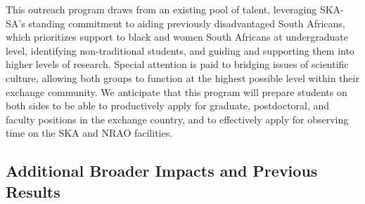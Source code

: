 \documentclass[preprint]{aastex}
\newcommand{\compress}{\vspace{-0.25in}}
\begin{document}
This outreach program draws from an existing pool of talent, 
leveraging SKA-SA's standing commitment to aiding previously disadvantaged South Africans,
which prioritizes support to black and women South Africans at undergraduate level,
identifying non-traditional students, and guiding and supporting them into
higher levels of research.  
Special attention is paid to bridging issues of
scientific culture, allowing both groups to function at the highest possible
level within their exchange community.  We anticipate that this program will
prepare students on both sides to be able to productively apply for graduate,
postdoctoral, and faculty positions in the exchange country, and to effectively
apply for observing time on the SKA and NRAO facilities.  

\compress
\subsection{Additional Broader Impacts and Previous Results}
\label{sec:other_broader}

\end{document}
